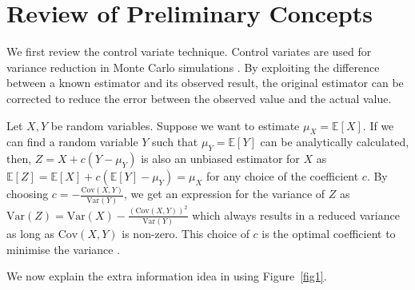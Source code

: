 \documentclass[runningheads]{llncs}
\begin{document}
\section{Review of Preliminary Concepts}
    
We first review the control variate technique. Control variates are used for variance reduction in Monte Carlo simulations \cite{rubinstein1985efficiency}. By exploiting the difference between a known estimator and its observed result, the original estimator can be corrected to reduce the error between the observed value and the actual value.

Let $X,Y$ be random variables. Suppose we want to estimate $\mu_X = \mathbb{E}[X]$. If we can find a random variable $Y$ such that $\mu_Y = \mathbb{E}[Y]$ can be analytically calculated, then, $Z = X + c(Y - \mu_Y)$ is also an unbiased estimator for $X$ as $\mathbb{E}[Z] = \mathbb{E}[X] + c(\mathbb{E}[Y] - \mu_Y) = \mu_X$ for any choice of the coefficient $c$. By choosing $c = -\frac{\text{Cov}(X, Y)}{\text{Var}(Y)}$, we get an expression for the variance of $Z$ as $\text{Var}(Z) = \text{Var}(X) - \frac{(\text{Cov}(X,Y))^2}{\text{Var}(Y)}$ which always results in a reduced variance as long as $\text{Cov}(X,Y)$ is non-zero. This choice of $c$ is the optimal coefficient to minimise the variance \cite{rubinstein1985efficiency}.

We now explain the extra information idea in \cite{kang2018improving,Kang2021-correlations} using Figure~\ref{fig1}.
\end{document}
